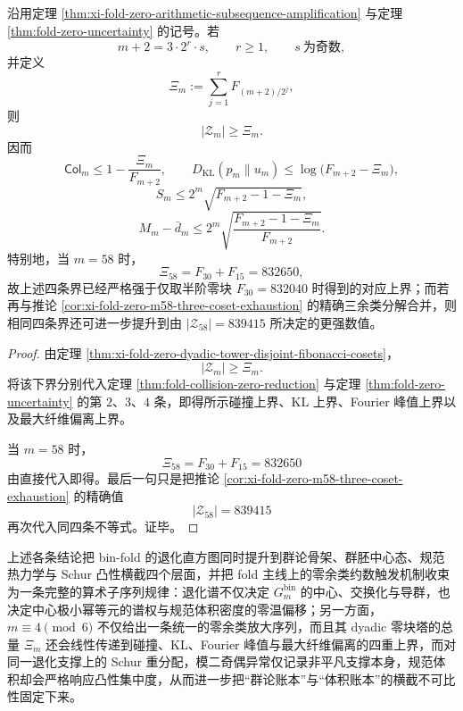 \begin{theorem}\label{thm:xi-fold-zero-dyadic-tower-synchronous-information-gap-improvement}\label{thm:xi-fold-zero-multiple6-information-gap-improvement}
沿用定理 \ref{thm:xi-fold-zero-arithmetic-subsequence-amplification} 与定理 \ref{thm:fold-zero-uncertainty} 的记号。若
\[
m+2=3\cdot 2^r\cdot s,
\qquad
r\ge 1,
\qquad
s\ \text{为奇数},
\]
并定义
\[
\Xi_m:=\sum_{j=1}^{r}F_{(m+2)/2^j},
\]
则
\[
|\mathcal Z_m|\ge \Xi_m.
\]
因而
\[
\mathsf{Col}_m
\le
1-\frac{\Xi_m}{F_{m+2}},
\qquad
D_{\mathrm{KL}}(p_m\|u_m)
\le
\log\!\bigl(F_{m+2}-\Xi_m\bigr),
\]
\[
S_m\le 2^m\sqrt{F_{m+2}-1-\Xi_m},
\]
\[
M_m-\bar d_m
\le
2^m\sqrt{\frac{F_{m+2}-1-\Xi_m}{F_{m+2}}}.
\]
特别地，当 \(m=58\) 时，
\[
\Xi_{58}=F_{30}+F_{15}=832650,
\]
故上述四条界已经严格强于仅取半阶零块 \(F_{30}=832040\) 时得到的对应上界；而若再与推论 \ref{cor:xi-fold-zero-m58-three-coset-exhaustion} 的精确三余类分解合并，则相同四条界还可进一步提升到由 \(|\mathcal Z_{58}|=839415\) 所决定的更强数值。
\end{theorem}
\begin{proof}
由定理 \ref{thm:xi-fold-zero-dyadic-tower-disjoint-fibonacci-cosets}，
\[
|\mathcal Z_m|\ge \Xi_m.
\]
将该下界分别代入定理 \ref{thm:fold-collision-zero-reduction} 与定理
\ref{thm:fold-zero-uncertainty} 的第 \(2\)、\(3\)、\(4\) 条，即得所示碰撞上界、KL 上界、Fourier 峰值上界以及最大纤维偏离上界。

当 \(m=58\) 时，
\[
\Xi_{58}=F_{30}+F_{15}=832650
\]
由直接代入即得。最后一句只是把推论
\ref{cor:xi-fold-zero-m58-three-coset-exhaustion} 的精确值
\[
|\mathcal Z_{58}|=839415
\]
再次代入同四条不等式。证毕。
\end{proof}



\noindent
上述各条结论把 bin-fold 的退化直方图同时提升到群论骨架、群胚中心态、规范热力学与 Schur 凸性横截四个层面，并把 fold 主线上的零余类约数触发机制收束为一条完整的算术子序列规律：退化谱不仅决定 \(G_m^{\mathrm{bin}}\) 的中心、交换化与导群，也决定中心极小幂等元的谱权与规范体积密度的零温偏移；另一方面，\(m\equiv 4\pmod 6\) 不仅给出一条统一的零余类放大序列，而且其 dyadic 零块塔的总量 \(\Xi_m\) 还会线性传递到碰撞、KL、Fourier 峰值与最大纤维偏离的四重上界，而对同一退化支撑上的 Schur 重分配，模二奇偶异常仅记录非平凡支撑本身，规范体积却会严格响应凸性集中度，从而进一步把“群论账本”与“体积账本”的横截不可比性固定下来。

\endinput
